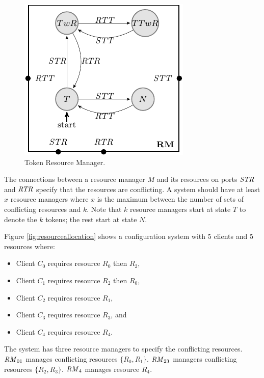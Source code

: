 \begin{figure}[H]
\begin{center}
\includegraphics[scale=1.2]{compiledfigures/token-crop.pdf}
\caption{Token Resource Manager.}
\label{fig:conflict-token}
\end{center}
\end{figure}

The connections between a resource manager $M$ and its resources on ports $\mathit{STR}$ and $\mathit{RTR}$ specify that the 
resources are conflicting. 
A system should have at least $x$ resource managers where $x$ is the maximum between the number of sets of conflicting resources 
and $k$.
Note that $k$ resource managers start at state $T$ to denote the $k$ tokens; the rest start at state $N$. 

Figure \ref{fig:resourceallocation} shows a configuration system with $5$ clients and $5$ resources where:
\begin{itemize}
  \item Client $C_0$ requires resource $R_0$ then $R_2$,
  \item Client $C_1$ requires resource $R_2$ then $R_0$,
  \item Client $C_2$ requires resource $R_1$,
  \item Client $C_3$ requires resource $R_3$, and
  \item Client $C_4$ requires resource $R_4$.
\end{itemize}

The system has three resource managers to specify the conflicting resources. 
$\mathit{RM}_{01}$ manages conflicting resources $\{R_0,R_1\}$. 
$\mathit{RM}_{23}$ managers conflicting resources $\{R_2,R_3\}$.
$\mathit{RM}_{4}$ manages resource $R_4$. 

